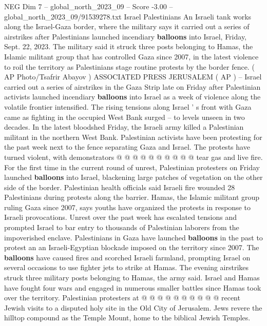 \begin{textsample}{NEG Dim 7 – global\_north\_2023\_09 – Score -3.00 – global\_north\_2023\_09/91539278.txt}  \label{ex:f7_neg_168}
Israel Palestinians An Israeli tank works along the Israel-Gaza border, where the military says it carried out a series of airstrikes after Palestinians launched incendiary \textbf{balloons} into Israel, Friday, Sept. 22, 2023.
The military said it struck three posts belonging to Hamas, the Islamic militant group that has controlled Gaza since 2007, in the latest violence to roil the territory as Palestinians stage routine protests by the border fence. ( AP Photo/Tsafrir Abayov ) ASSOCIATED PRESS JERUSALEM ( AP ) -- Israel carried out a series of airstrikes in the Gaza Strip late on Friday after Palestinian activists launched incendiary \textbf{balloons} into Israel as a week of violence along the volatile frontier intensified.
The rising tensions along Israel ' s front with Gaza came as fighting in the occupied West Bank surged -- to levels unseen in two decades.
In the latest bloodshed Friday, the Israeli army killed a Palestinian militant in the northern West Bank.
Palestinian activists have been protesting for the past week next to the fence separating Gaza and Israel.
The protests have turned violent, with demonstrators @ @ @ @ @ @ @ @ @ @ tear gas and live fire.
For the first time in the current round of unrest, Palestinian protesters on Friday launched \textbf{balloons} into Israel, blackening large patches of vegetation on the other side of the border.
Palestinian health officials said Israeli fire wounded 28 Palestinians during protests along the barrier.
Hamas, the Islamic militant group ruling Gaza since 2007, says youths have organized the protests in response to Israeli provocations.
Unrest over the past week has escalated tensions and prompted Israel to bar entry to thousands of Palestinian laborers from the impoverished enclave.
Palestinians in Gaza have launched \textbf{balloons} in the past to protest an an Israeli-Egyptian blockade imposed on the territory since 2007.
The \textbf{balloons} have caused fires and scorched Israeli farmland, prompting Israel on several occasions to use fighter jets to strike at Hamas.
The evening airstrikes struck three military posts belonging to Hamas, the army said.
Israel and Hamas have fought four wars and engaged in numerous smaller battles since Hamas took over the territory.
Palestinian protesters at @ @ @ @ @ @ @ @ @ @ recent Jewish visits to a disputed holy site in the Old City of Jerusalem.
Jews revere the hilltop compound as the Temple Mount, home to the biblical Jewish Temples.

\end{textsample}
